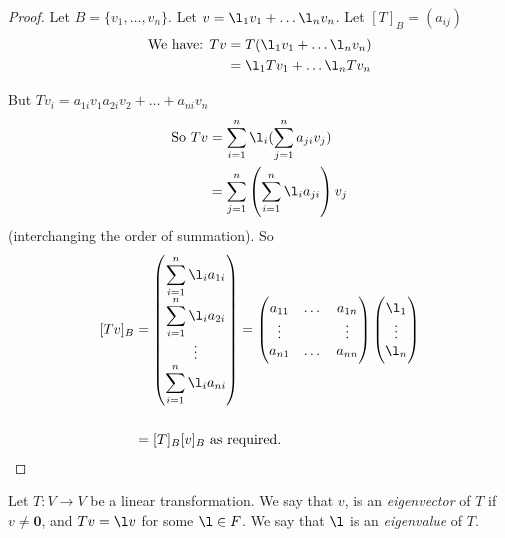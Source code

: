 \documentclass[10pt]{scrartcl}
\begin{document}
\begin{proof}
Let $B = \{v_1,\dots,v_n\}$. Let $v = \l_1v_1 + \dots \l_nv_n$. Let $[T]_B = (a_{ij})$\\
\[
\begin{aligned}
\text{We  have: } Tv &= T(\l_1v_1 + \dots \l_nv_n) \\
& = \l_1Tv_1 + \dots \l_nTv_n
\end{aligned}\]

But $Tv_i = a_{1i}v_1 a_{2i}v_2 + \dots + a_{ni}v_n$\\
 \[\begin{aligned}
\text{So } Tv &= \sum_{i = 1}^{n} \l_i(\sum_{j = 1}^n a_{ji}v_j) \\
&= \sum_{j = 1}^n \left(\sum_{i=1}^n \l_i a_{ji}\right) v_j
\end{aligned}\]
(interchanging the order of summation).
So  \[
\begin{aligned}
[Tv]_B &= \begin{pmatrix}
 \displaystyle{\sum_{i=1}^n \l_i a_{1i}}\\
 \displaystyle{\sum_{i=1}^n \l_i a_{2i}}\\
 \vdots \\
\displaystyle{ \sum_{i=1}^n \l_i a_{ni} }
 \end{pmatrix}
 = 
 \begin{pmatrix}
 a_{11} & \dots & a_{1n} \\
 \vdots & & \vdots \\
 a_{n1} & \dots & a_{nn} 
 \end{pmatrix}
 \begin{pmatrix}
 \l_1 \\ \vdots \\ \l_n
 \end{pmatrix} \\\\
   &= [T]_B[v]_B \text{ as required.}
  \end{aligned}
\]
\end{proof}


\vspace*{5pt}

\begin{definition} 
 Let $T: V \to V$ be a linear transformation. We say that $v$, is an \emph{eigenvector} of $T$ if $v \neq \mathbf{0}$, and $Tv = \l v$ for some $\l \in F$. We say that $\l$ is an \emph{eigenvalue} of $T$.\end{definition}\vspace*{5pt}
\end{document}
